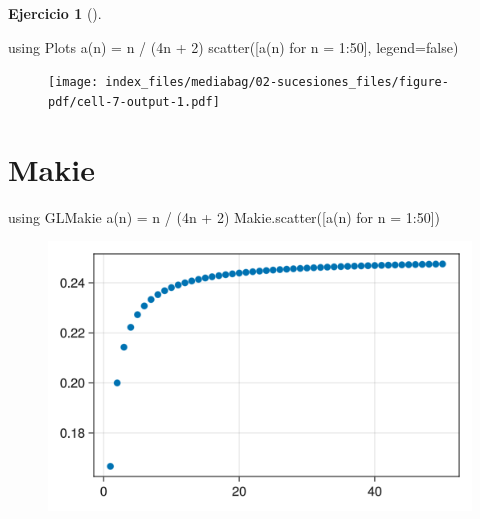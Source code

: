\documentclass[
  a4paper,
]{scrreport}
\newenvironment{Shaded}{\begin{snugshade}}{\end{snugshade}}
\newcommand{\BuiltInTok}[1]{\textcolor[rgb]{0.00,0.23,0.31}{#1}}
\newcommand{\ConstantTok}[1]{\textcolor[rgb]{0.56,0.35,0.01}{#1}}
\newcommand{\FloatTok}[1]{\textcolor[rgb]{0.68,0.00,0.00}{#1}}
\newcommand{\FunctionTok}[1]{\textcolor[rgb]{0.28,0.35,0.67}{#1}}
\newcommand{\ImportTok}[1]{\textcolor[rgb]{0.00,0.46,0.62}{#1}}
\newcommand{\NormalTok}[1]{\textcolor[rgb]{0.00,0.23,0.31}{#1}}
\newcommand{\OperatorTok}[1]{\textcolor[rgb]{0.37,0.37,0.37}{#1}}
\theoremstyle{definition}
\newtheorem{exercise}{Ejercicio}[chapter]
\theoremstyle{remark}
\begin{document}
\begin{exercise}[]
\begin{tcolorbox}
\begin{Shaded}
\begin{Highlighting}[]
\ImportTok{using} \BuiltInTok{Plots}
\FunctionTok{a}\NormalTok{(n) }\OperatorTok{=}\NormalTok{ n }\OperatorTok{/}\NormalTok{ (}\FloatTok{4}\NormalTok{n }\OperatorTok{+} \FloatTok{2}\NormalTok{)}
\FunctionTok{scatter}\NormalTok{([}\FunctionTok{a}\NormalTok{(n) for n }\OperatorTok{=} \FloatTok{1}\OperatorTok{:}\FloatTok{50}\NormalTok{], legend}\OperatorTok{=}\ConstantTok{false}\NormalTok{)}
\end{Highlighting}
\end{Shaded}

\begin{figure}[H]

{\centering \texttt{[image: index\_files/mediabag/02-sucesiones\_files/figure-pdf/cell-7-output-1.pdf]}

}

\end{figure}

\section{Makie}

\begin{Shaded}
\begin{Highlighting}[]
\ImportTok{using} \BuiltInTok{GLMakie}
\FunctionTok{a}\NormalTok{(n) }\OperatorTok{=}\NormalTok{ n }\OperatorTok{/}\NormalTok{ (}\FloatTok{4}\NormalTok{n }\OperatorTok{+} \FloatTok{2}\NormalTok{)}
\NormalTok{Makie.}\FunctionTok{scatter}\NormalTok{([}\FunctionTok{a}\NormalTok{(n) for n }\OperatorTok{=} \FloatTok{1}\OperatorTok{:}\FloatTok{50}\NormalTok{])}
\end{Highlighting}
\end{Shaded}

\begin{figure}[H]

{\centering \includegraphics{02-sucesiones_files/figure-pdf/cell-8-output-1.png}

}
\end{figure}
\end{tcolorbox}
\end{exercise}
\end{document}

